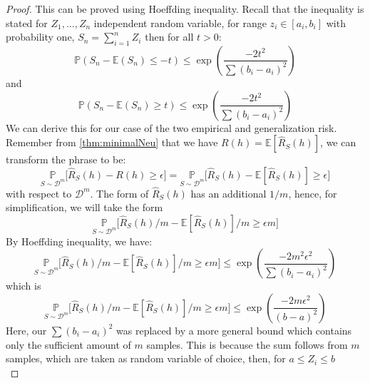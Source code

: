 \begin{proof}
    This can be proved using Hoeffding inequality. Recall that the inequality is stated for $Z_{1},\dots,Z_{n}$ independent random variable, for range $z_{i}\in [a_{i},b_{i}]$ with probability one, $S_{n}=\sum_{i=1}^{n}Z_{i}$ then for all $t>0$:
    \begin{equation*}
        \mathbb{P}(S_{n} - \mathbb{E}(S_n)\leq -t) \leq \exp{\left(\frac{-2t^2}{\sum (b_{i} - a_{i})^{2}}\right)}
    \end{equation*}
    and 
    \begin{equation*}
        \mathbb{P}(S_{n} - \mathbb{E}(S_n)\geq t) \leq \exp{\left(\frac{-2t^2}{\sum (b_{i} - a_{i})^{2}}\right)}
    \end{equation*}
    We can derive this for our case of the two empirical and generalization risk. Remember from \ref{thm:minimalNeu} that we have $R(h)=\mathbb{E}[\hat{R}_{S}(h)]$, we can transform the phrase to be: \begin{equation*}
        \underset{S\sim \mathcal{D}^{m}}{\mathbb{P}} \Big[ \hat{R}_{S}(h) - R(h) \geq \epsilon \Big] = \underset{S\sim \mathcal{D}^{m}}{\mathbb{P}} \Big[ \hat{R}_{S}(h) - \mathbb{E}[\hat{R}_{S}(h)] \geq \epsilon \Big]
    \end{equation*}
    with respect to $\mathcal{D}^{m}$. The form of $\hat{R}_{S}(h)$ has an additional $1/m$, hence, for simplification, we will take the form \begin{equation*}
        \underset{S\sim \mathcal{D}^{m}}{\mathbb{P}} \Big[ \hat{R}_{S}(h)/m - \mathbb{E}[\hat{R}_{S}(h)]/m \geq \epsilon m \Big]
    \end{equation*}
    By Hoeffding inequality, we have: 
    \begin{equation}
        \underset{S\sim \mathcal{D}^{m}}{\mathbb{P}} \Big[ \hat{R}_{S}(h)/m - \mathbb{E}[\hat{R}_{S}(h)]/m \geq \epsilon m \Big] \leq \exp{\left(\frac{-2m^{2}\epsilon^{2}}{\sum (b_{i} - a_{i})^{2}}\right)} 
    \end{equation}
    which is 
    \begin{equation*}
        \underset{S\sim \mathcal{D}^{m}}{\mathbb{P}} \Big[ \hat{R}_{S}(h)/m - \mathbb{E}[\hat{R}_{S}(h)]/m \geq \epsilon m \Big] \leq \exp{\left(\frac{-2m\epsilon^{2}}{(b-a)^{2}}\right)}
    \end{equation*}
    Here, our $\sum (b_{i} - a_{i})^{2}$ was replaced by a more general bound which contains only the sufficient amount of $m$ samples. This is because the sum follows from $m$ samples, which are taken as random variable of choice, then, for $a\leq Z_i \leq b$ \begin{equation*}

\end{equation*}
\end{proof}
